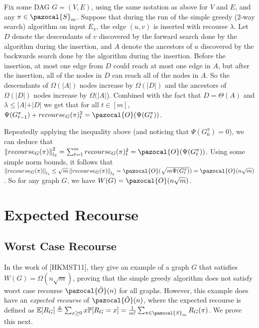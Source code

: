 \documentclass{article}
\newcommand{\norm}[1]{\left\lVert#1\right\rVert}
\begin{document}
Fix some DAG $G=(V,E)$, using the same notation as above for $V$ and $E$, and any $\pi \in \pazocal{S}_{m}$. Suppose that during the run of the simple greedy (2-way search) algorithm on input $E_{\pi}$, the edge $(u,v)$ is inserted with recourse $\lambda$. Let $D$ denote the descendants of $v$ discovered by the forward search done by the algorithm during the insertion, and $A$ denote the ancestors of $u$ discovered by the backwards search done by the algorithm during the insertion. Before the insertion, at most one edge from $D$ could reach at most one edge in $A$, but after the insertion, all of the nodes in $D$ can reach all of the nodes in $A$. So the descendants of $\Omega(\vert A \vert)$ nodes increase by $\Omega(\vert D\vert)$ and the ancestors of $\Omega(\vert D\vert)$ nodes increase by $\Omega(\vert A \vert$). Combined with the fact that $D = \Theta(A)$ and $\lambda \leq \vert A\vert + \vert D\vert$ we get that for all $t \in [m]$, $\Psi(G_{t-1}^{\pi}) + recourse_{G}(\pi)_{t}^{2} = \pazocal{O}(\Psi(G_{t}^{\pi}))$.

Repeatedly applying the inequality above (and noticing that $\Psi(G_{0}^{\pi})=0$), we can deduce that $\norm{recourse_{G}(\pi)}_{l_{2}}^{2} = \sum_{t=1}^{m}{recourse_{G}(\pi)^{2}_{t}} = \pazocal{O}(\Psi(G_{t}^{\pi}))$. Using some simple norm bounds, it follows that $\norm{recourse_{G}(\pi)}_{l_{1}} \leq \sqrt{m}\norm{recourse_{G}(\pi)}_{l_{2}} = \pazocal{O}(\sqrt{m\Psi(G_{t}^{\pi})}) = \pazocal{O}(n\sqrt{m})$. So for any graph $G$, we have $W(G)=\pazocal{O}(n\sqrt{m})$.

\section{Expected Recourse}

\subsection{Worst Case Recourse}

In the work of [HKMST11], they give an example of a graph $G$ that satisfies $W(G) = \Omega(n\sqrt{m})$, proving that the simple greedy algorithm does not satisfy worst case recourse $\pazocal{\tilde{O}}(n)$ for all graphs. However, this example does have an \textit{expected recourse} of $\pazocal{\tilde{O}}(n)$, where the expected recourse is defined as $\mathbb{E}[R_{G}] \triangleq \sum_{x \geq 0} x \mathbb{P}[R_{G}=x] = \frac{1}{m!} \sum_{\pi \in \pazocal{S}_{m}}R_{G}(\pi)$. We prove this next.
\end{document}
